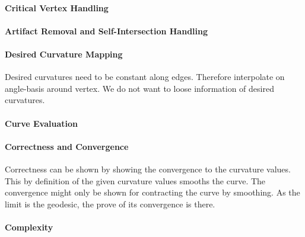 \documentclass{stdlocal}
\begin{document}
  \paragraph{Critical Vertex Handling}
  \paragraph{Artifact Removal and Self-Intersection Handling}
  \paragraph{Desired Curvature Mapping}
    Desired curvatures need to be constant along edges.
    Therefore interpolate on angle-basis around vertex.
    We do not want to loose information of desired curvatures.
  \paragraph{Curve Evaluation}
  \paragraph{Correctness and Convergence}
    Correctness can be shown by showing the convergence to the curvature values.
    This by definition of the given curvature values smooths the curve.
    The convergence might only be shown for contracting the curve by smoothing.
    As the limit is the geodesic, the prove of its convergence is there.
  \paragraph{Complexity}

\end{document}
